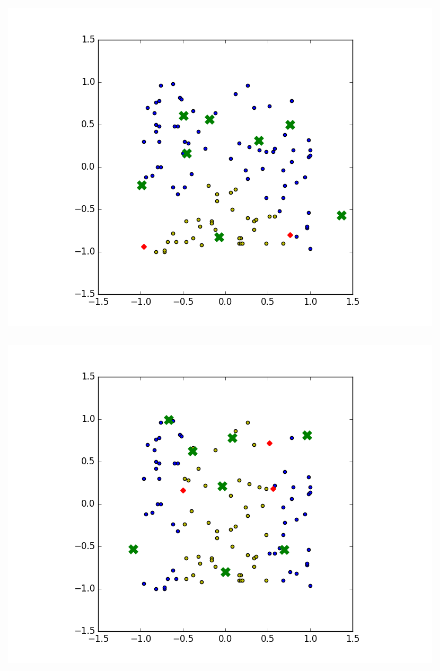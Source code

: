 \documentclass[notitlepage]{report}
\theoremstyle{definition}
\begin{document}
\begin{figure}[H]
  \centering
  \begin{minipage}[b]{0.7\textwidth}
    \includegraphics[width=\textwidth]{RBFN-01.png}
    \caption{}
    \label{fig:RBFN-01}
  \end{minipage}
  \hfill
\end{figure}
\begin{figure}[H]
  \centering
  \begin{minipage}[b]{0.7\textwidth}
    \includegraphics[width=\textwidth]{RBFN-02.png}
    \caption{}
    \label{fig:RBFN-02}
  \end{minipage}
  \hfill
\end{figure}
\end{document}
